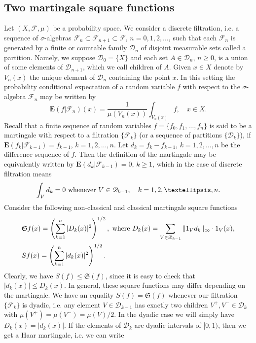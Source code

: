 \documentclass[12pt,reqno,fleqn]{amsart}
\theoremstyle{definition}
\theoremstyle{definition}
\theoremstyle{remark}
\def\ZF{\ensuremath{\mathscr  F}}
\def\ZS{\ensuremath{\mathfrak S}}
\def\ZI{\ensuremath{\textbf 1}}
\def\ZD{\ensuremath{\mathscr  D}}
\def\ZE{\ensuremath{\mathbf E}}
\numberwithin{equation}{section}
\begin{document}
\subsection{Two martingale square functions}
	Let $(X,\ZF, \mu)$ be a probability space. We consider a discrete filtration, i.e. a sequence of $\sigma$-algebras $\ZF_n\subset \ZF_{n+1}\subset \ZF$, $n=0,1,2,\ldots$, such that each $\ZF_n$ is generated by a finite or countable family $\ZD_n$ of disjoint measurable sets called a partition. Namely, we suppose $\ZD_0=\{X\}$ and each set $A\in \ZD_n$, $n\ge 0$, is a union of some elements of $\ZD_{n+1}$, which we call children of $A$. Given $x\in X$ denote by $V_n(x)$ the unique element of $\ZD_n$ containing the point $x$. In this setting the probability conditional expectation of a random variable $f$ with respect to the $\sigma$-algebra $\ZF_n$ may be written by
	\begin{equation}
		\ZE(f|\ZF_n)(x)=\frac{1}{\mu(V_n(x))}\int_{V_n(x)}f,\quad x\in X.
	\end{equation}
	Recall that a finite sequence of random variables $f=\{f_0, f_1,\ldots,f_n\}$ is said to be a martingale with respect to a filtration $\{\ZF_k\}$ (or a sequence of partitions $\{\ZD_k\}$), if $\ZE(f_k|\ZF_{k-1})=f_{k-1}$, $k=1,2,\ldots,n$. Let $d_k=f_k-f_{k-1}$, $k=1,2,\ldots,n$  be the difference sequence of $f$. 
	Then the definition of the martingale may be equivalently written by $\ZE(d_k|\ZF_{k-1})=0$, $k\ge1$, which in the case of discrete filtration means
	\begin{equation}\label{x57}
		\int_Vd_k=0 \hbox{ whenever }V\in \ZD_{k-1},\quad k=1,2,\ldots,n.
	\end{equation} 
Consider the following non-classical and classical martingale square functions
\begin{align}
	&\ZS f(x)=\left(\sum_{k=1}^n |D_k(x)|^2\right)^{1/2},\hbox{ where } D_k(x)=\sum_{V\in \ZD_{k-1}}\|\ZI_{V}d_k\|_\infty\cdot \ZI_V(x),\label{x42}\\
	&Sf(x)=\left(\sum_{k=1}^n |d_k(x)|^2\right)^{1/2}.\label{x53}
\end{align}
Clearly, we have $S(f)\le \ZS(f)$, since it is easy to check that $|d_k(x)|\le D_k(x)$. In general, these square functions may differ depending on the martingale. We have an equality $S(f)= \ZS(f)$ whenever our filtration $\{\ZF_k\}$ is dyadic, i.e. any element $V\in \ZD_{k-1}$ has exactly two children $V^+,V^-\in \ZD_k$ with $\mu(V^+)=\mu(V^-)=\mu(V)/2$. In the dyadic case we will simply have $D_k(x)=|d_k(x)|$. If the elements of $\ZD_k$ are dyadic intervals of $[0,1)$, then we get a Haar martingale, i.e. we can write 
\end{document}
